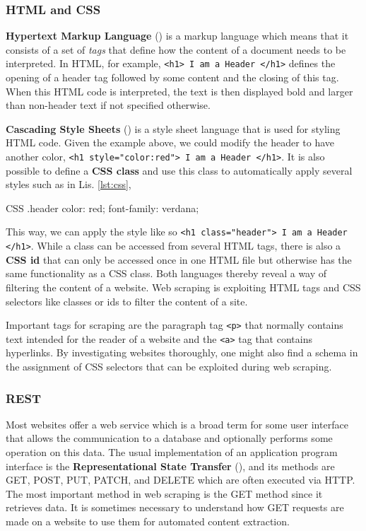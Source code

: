 \subsubsection{HTML and CSS}
  \textbf{Hypertext Markup Language} () is a markup language which means that it consists of a set of \textsl{tags} that define how the content of a document needs to be interpreted.
  In HTML, for example, \texttt{<h1> I am a Header </h1>} defines the opening of a header tag followed by some content and the closing of this tag.
  When this HTML code is interpreted, the text is then displayed bold and larger than non-header text if not specified otherwise.

  \textbf{Cascading Style Sheets} () is a style sheet language that is used for styling HTML code.
  Given the example above, we could modify the header to have another color, \texttt{<h1 style="color:red">  I am a Header </h1>}.
  It is also possible to define a \textbf{CSS class} and use this class to automatically apply several styles such as in Lis. \ref{lst:css},
  \begin{listing}[h!]
    \centering
    \begin{cminted}{CSS}
      .header {
        color: red;
        font-family: verdana;
      }
    \end{cminted}
    \caption{CSS class named \emph{header} that sets the font to verdana and color to red when used.}
    \label{lst:css}
  \end{listing}
  This way, we can apply the style like so \texttt{<h1 class="header"> I am a Header </h1>}.
  While a class can be accessed from several HTML tags, there is also a \textbf{CSS id} that can only be accessed once in one HTML file but otherwise has the same functionality as a CSS class.
  Both languages thereby reveal a way of filtering the content of a website.
  Web scraping is exploiting HTML tags and CSS selectors like classes or ids to filter the content of a site.

  Important tags for scraping are the paragraph tag \texttt{<p>} that normally contains text intended for the reader of a website and the \texttt{<a>} tag that contains hyperlinks.
  By investigating websites thoroughly, one might also find a schema in the assignment of CSS selectors that can be exploited during web scraping.

\subsubsection{REST}
  Most websites offer a web service which is a broad term for some user interface that allows the communication to a database and optionally performs some operation on this data.
  The usual implementation of an application program interface is the \textbf{Representational State Transfer} (), and its methods are GET, POST, PUT, PATCH, and DELETE which are often executed via HTTP.
  The most important method in web scraping is the GET method since it retrieves data.
  It is sometimes necessary to understand how GET requests are made on a website to use them for automated content extraction.

